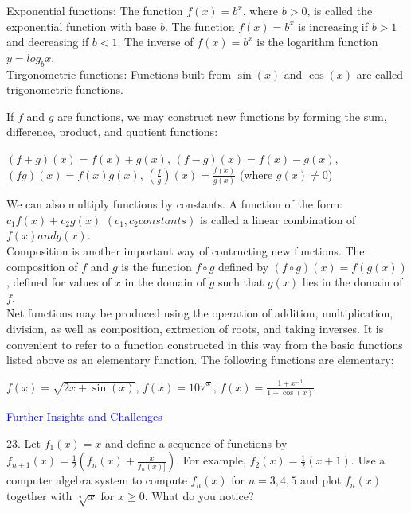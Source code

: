 \documentclass{article}
\begin{document}
Exponential functions: The function $f(x) = b^x$, where $b > 0$, is called the exponential function with base $b$. The function $f(x) = b^x$ is increasing if $b > 1$ and decreasing if $b < 1$. The inverse of $f(x) = b^x$ is the logarithm function $y = log_{b}x$.\\

Tirgonometric functions: Functions built from $\sin(x)$ and $\cos(x)$ are called trigonometric functions.

If $f$ and $g$ are functions, we may construct new functions by forming the sum, difference, product, and quotient functions:\\
\begin{center} $(f + g)(x) = f(x) + g(x)$, $(f - g)(x) = f(x) - g(x)$, $(fg)(x) = f(x)g(x)$, $(\frac{f}{g})(x) = \frac{f(x)}{g(x)}$ (where $g(x) \neq 0$)\end{center}

We can also multiply functions by constants. A function of the form: $c_1f(x) + c_2g(x)$ $(c_1, c_2 constants)$ is called a linear combination of $f(x) and g(x)$.\\

Composition is another important way of contructing new functions. The composition of $f$ and $g$ is the function $f \circ g$ defined by $(f \circ g)(x) = f(g(x))$, defined for values of $x$ in the domain of $g$ such that $g(x)$ lies in the domain of $f$.\\

Net functions may be produced using the operation of addition, multiplication, division, as well as composition, extraction of roots, and taking inverses. It is convenient to refer to a function constructed in this way from the basic functions listed above as an elementary function. The following functions are elementary:\\
\begin{center} $f(x) = \sqrt{2x + \sin(x)}$, $f(x) = 10^{\sqrt{x}}$, $f(x) = \frac{1 + x^{-1}}{1 + \cos(x)}$\end{center}

\textcolor{blue}{Further Insights and Challenges}

23. Let $f_1(x) = x$ and define a sequence of functions by $f_{n+1}(x) = \frac{1}{2}(f_n(x) + \frac{x}{f_n(x)]})$. For example, $f_2(x) = \frac{1}{2}(x + 1)$. Use a computer algebra system to compute $f_n(x)$ for $n = 3,4,5$ and plot $f_n(x)$ together with $\sqrt[2]{x}$ for $x \geq 0$. What do you notice?\\
\end{document}

